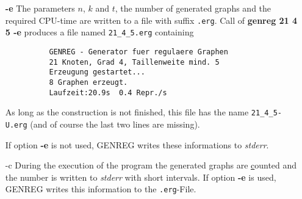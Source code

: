 \begin{itemize}
  One after the other all vertices $1,...,n$ are regarded. Only
  adjacent vertices with larger number than the regarded vertex itself
  are added to the code.
  Thus we have for every edge of the graph exactly
  one entry in the code. For the example above ($n=4$, $k=3$) you
  get 
 
  \hspace{1cm}{\tt 2 3 4 3 4 4} 

  as code. 
  To achieve a further compression of the data, we compare
  the code of the next graph to be constructed with the 
  preceeding and find out, in how many entries at the begining
  the two codes are equal. Instead of writing the common
  pieces twice on the file, we only store its length and
  then the differing entries. Thus as first entry of the file
  we always have zero. The 4-regular graphs on 7 vertices
  have the codes 
  
  \hspace{1cm} {\tt 2 3 4 5 3 4 5 6 7 6 7 6 7 7} and

  \hspace{1cm} {\tt 2 3 4 5 3 4 6 5 7 6 7 6 7 7}

  The file {\bf \verb|07_4_3.scd|} consists of 
    
  \hspace{1cm}{\tt 0 2 3 4 5 3 4 5 6 7 6 7 6 7 7 6 6 5 7 6 7 6 7 7}

  and has length of 24 byte. This kind of comprimation gains effectivity for
  big $n$ or $t>3$. The program {\em readscd.c}  shows easy funktions,
  which are able to read shortcode-files. 

  Even this option can be followed by an integer or {\bf stdout} if
  only a certain number of graphs shall be stored or you want to use
  {\em stdout}.  

  \item[\bf -e]
  The parameters $n$, $k$ and $t$, the number of generated graphs 
  and the required CPU-time are written to a file with suffix 
  \verb|.erg|. Call of {\bf genreg 21 4 5 -e} produces a file named
  \verb|21_4_5.erg| containing 
  \begin{verbatim}
          GENREG - Generator fuer regulaere Graphen
          21 Knoten, Grad 4, Taillenweite mind. 5
          Erzeugung gestartet...
          8 Graphen erzeugt.
          Laufzeit:20.9s  0.4 Repr./s \end{verbatim}
  As long as the construction is not finished, this file has the
  name \verb|21_4_5-U.erg| (and of course the last two lines are
  missing).

  If option {\bf -e} is not used, GENREG writes these informations
  to {\em stderr}.

  \item[-c]
  During the execution of the program the generated graphs are 
  \underline{c}ounted and the number is written to {\em stderr} with
  short intervals.
  If option {\bf -e} is used, GENREG writes this information
  to the \verb|.erg|-File.
\end{itemize}

